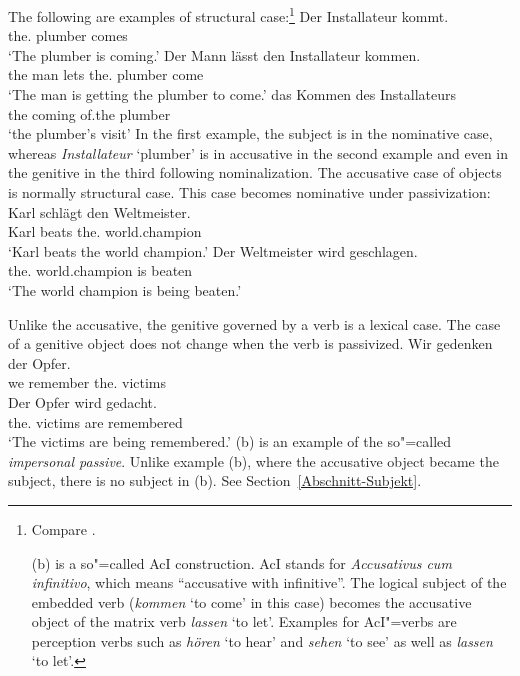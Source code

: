 The following are examples of structural case:\footnote{
        Compare .

		(b) is a so"=called AcI construction. AcI stands for \emph{Accusativus cum infinitivo}, which means ``accusative
		with infinitive''. The logical subject of the embedded verb (\emph{kommen} `to come'
                in this case) becomes the accusative object of the matrix verb \emph{lassen} `to let'.
		Examples for AcI"=verbs are perception verbs such as \emph{hören} `to hear' and \emph{sehen} `to see'
		as well as \emph{lassen} `to let'.
}
\eal
\ex 
\gll Der Installateur kommt.\\
	 the.\nom{} plumber comes\\
\glt `The plumber is coming.'
\ex 
\gll Der Mann lässt den Installateur kommen.\\
	 the man lets the.\acc{} plumber come\\
\glt `The man is getting the plumber to come.'
\ex 
\gll das Kommen des Installateurs\\
	 the coming of.the plumber\\
\glt `the plumber's visit'
\zl
In the first example, the subject is in the nominative case, whereas \emph{Installateur} `plumber' is
in accusative in the second example and even in the genitive in the third following nominalization.
The accusative case of objects is normally structural case. This case becomes nominative under passivization:
\eal
\ex 
\gll Karl schlägt den Weltmeister.\\
     Karl beats the.\acc{} world.champion\\
\glt `Karl beats the world champion.'
\ex 
\gll Der Weltmeister wird geschlagen.\\
	 the.\nom{} world.champion is beaten\\
\glt `The world champion is being beaten.'
\zl

\noindent
Unlike the accusative, the genitive governed by a verb is a lexical case. The case of a genitive object does not change when
the verb is passivized.
\eal
\ex
\gll Wir gedenken der Opfer.\\
     we remember the.\gen{} victims\\
\ex 
\gll Der Opfer wird gedacht.\\
	 the.\gen{} victims are remembered\\
\glt `The victims are being remembered.'
\zl
(b) is an example of the so"=called \emph{impersonal passive}. Unlike example (b), where the accusative
object became the subject, there is no subject in (b). See Section~\ref{Abschnitt-Subjekt}.

